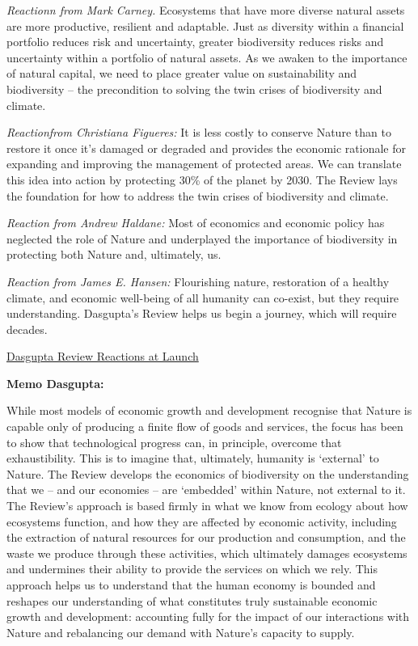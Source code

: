 \documentclass[
]{book}
\begin{document}
\emph{Reactionn from Mark Carney.}
Ecosystems that have more diverse natural assets are more productive, resilient and adaptable. Just as diversity within a financial portfolio reduces risk and uncertainty, greater biodiversity reduces risks and uncertainty within a portfolio of natural assets. As we awaken to the importance of natural capital, we need to place greater value on sustainability and biodiversity -- the precondition to solving the twin crises of biodiversity and climate.

\emph{Reactionfrom Christiana Figueres:}
It is less costly to conserve Nature than to restore it once it's damaged or degraded and provides the economic rationale for expanding and improving the management of protected areas. We can translate this idea into action by protecting 30\% of the planet by 2030. The Review lays the foundation for how to address the twin crises of biodiversity and climate.

\emph{Reaction from Andrew Haldane:}
Most of economics and economic policy has neglected the role of Nature and
underplayed the importance of biodiversity in protecting both Nature and, ultimately, us.

\emph{Reaction from James E. Hansen:}
Flourishing nature, restoration of a healthy climate, and economic well-being of all humanity can co-exist, but they require understanding. Dasgupta's Review helps us begin a journey, which will require decades.

\href{https://www.gov.uk/government/publications/final-report-the-economics-of-biodiversity-the-dasgupta-review/the-economics-of-biodiversity-the-dasgupta-review-reactions}{Dasgupta Review Reactions at Launch}

\textbf{Memo Dasgupta:}

While most models of economic growth and development recognise that Nature is capable only
of producing a finite flow of goods and services, the focus has been to show that technological
progress can, in principle, overcome that exhaustibility. This is to imagine that, ultimately,
humanity is `external' to Nature.
The Review develops the economics of biodiversity on the understanding that we -- and our
economies -- are `embedded' within Nature, not external to it. The Review's approach is based
firmly in what we know from ecology about how ecosystems function, and how they are
affected by economic activity, including the extraction of natural resources for our production
and consumption, and the waste we produce through these activities, which ultimately damages
ecosystems and undermines their ability to provide the services on which we rely. This approach
helps us to understand that the human economy is bounded and reshapes our understanding
of what constitutes truly sustainable economic growth and development: accounting fully for
the impact of our interactions with Nature and rebalancing our demand with Nature's capacity
to supply.
\end{document}
